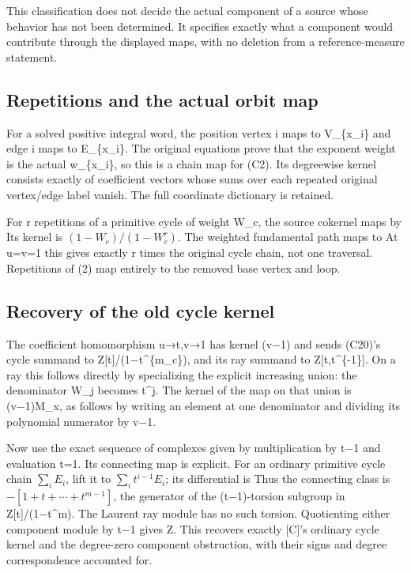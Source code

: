 This classification does not decide the actual component of a source
whose behavior has not been determined. It specifies exactly what a
component would contribute through the displayed maps, with no deletion
from a reference-measure statement.

\subsection{Repetitions and the actual orbit map}

For a solved positive integral word, the position vertex i maps to
V\_\{x\_i\} and edge i maps to E\_\{x\_i\}. The original equations prove
that the exponent weight is the actual w\_\{x\_i\}, so this is a chain
map for (C2). Its degreewise kernel consists exactly of coefficient
vectors whose sums over each repeated original vertex/edge label vanish.
The full coordinate dictionary is retained.

For r repetitions of a primitive cycle of weight W\_c, the source
cokernel maps by
Its kernel is \((1-W_c)/(1-W_c^r)\). The weighted fundamental path maps
to  At u=v=1 this gives
exactly r times the original cycle chain, not one traversal. Repetitions
of (2) map entirely to the removed base vertex and loop.

\subsection{Recovery of the old cycle kernel}

The coefficient homomorphism u→t,v→1 has kernel (v−1) and sends (C20)'s
cycle summand to Z{[}t{]}/(1−t\^{}\{m\_c\}), and its ray summand to
Z{[}t,t\^{}\{-1\}{]}. On a ray this follows directly by specializing the
explicit increasing union: the denominator W\_j becomes t\^{}j. The
kernel of the map on that union is (v−1)M\_x, as follows by writing an
element at one denominator and dividing its polynomial numerator by v−1.

Now use the exact sequence of complexes given by multiplication by t−1
and evaluation t=1. Its connecting map is explicit. For an ordinary
primitive cycle chain \(\sum_i E_i\), lift it to \(\sum_i t^{i-1}E_i\);
its differential is
 Thus the
connecting class is \(-[1+t+\cdots+t^{m-1}]\), the generator of the
(t−1)-torsion subgroup in Z{[}t{]}/(1−t\^{}m). The Laurent ray module
has no such torsion. Quotienting either component module by t−1 gives Z.
This recovers exactly {[}C{]}'s ordinary cycle kernel and the
degree-zero component obstruction, with their signs and degree
correspondence accounted for.

